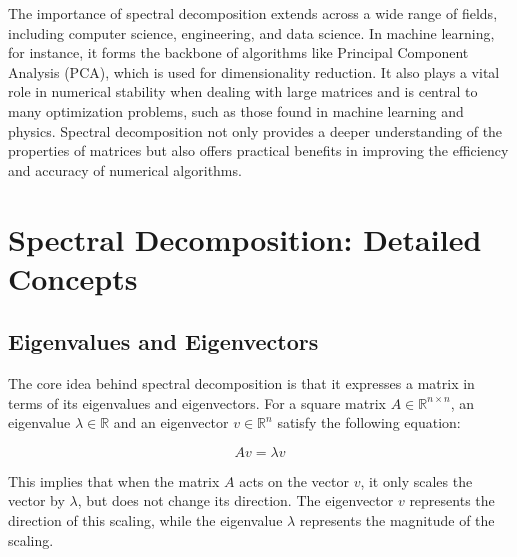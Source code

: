 \documentclass[
  letterpaper,
  DIV=11,
  numbers=noendperiod]{scrreprt}
\theoremstyle{plain}
\theoremstyle{definition}
\theoremstyle{remark}
\begin{document}
The importance of spectral decomposition extends across a wide range of
fields, including computer science, engineering, and data science. In
machine learning, for instance, it forms the backbone of algorithms like
Principal Component Analysis (PCA), which is used for dimensionality
reduction. It also plays a vital role in numerical stability when
dealing with large matrices and is central to many optimization
problems, such as those found in machine learning and physics. Spectral
decomposition not only provides a deeper understanding of the properties
of matrices but also offers practical benefits in improving the
efficiency and accuracy of numerical algorithms.

\section{Spectral Decomposition: Detailed
Concepts}\label{spectral-decomposition-detailed-concepts}

\subsection{Eigenvalues and
Eigenvectors}\label{eigenvalues-and-eigenvectors}

The core idea behind spectral decomposition is that it expresses a
matrix in terms of its eigenvalues and eigenvectors. For a square matrix
\(A \in \mathbb{R}^{n \times n}\), an eigenvalue
\(\lambda \in \mathbb{R}\) and an eigenvector \(v \in \mathbb{R}^{n}\)
satisfy the following equation:

\[
A v = \lambda v
\]

This implies that when the matrix \(A\) acts on the vector \(v\), it
only scales the vector by \(\lambda\), but does not change its
direction. The eigenvector \(v\) represents the direction of this
scaling, while the eigenvalue \(\lambda\) represents the magnitude of
the scaling.
\end{document}
